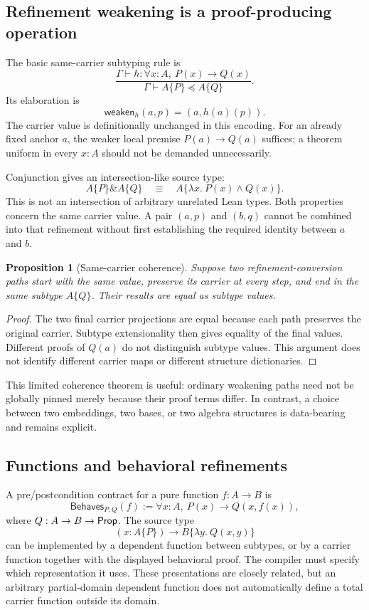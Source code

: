 \documentclass[11pt,letterpaper]{article}
\newtheorem{proposition}[theorem]{Proposition}
\theoremstyle{definition}\newtheorem{definition}[theorem]{Definition}
\begin{document}
\subsection{Refinement weakening is a proof-producing operation}
The basic same-carrier subtyping rule is
\[
 \frac{\Gamma\vdash h:\forall x:A,\ P(x)\to Q(x)}
      {\Gamma\vdash A\{P\}\preceq A\{Q\}}.
\]
Its elaboration is
\[
 \mathsf{weaken}_h(a,p)=(a,h(a)(p)).
\]
The carrier value is definitionally unchanged in this encoding. For an already fixed anchor $a$, the weaker local premise $P(a)\to Q(a)$ suffices; a theorem uniform in every $x:A$ should not be demanded unnecessarily.

Conjunction gives an intersection-like source type:
\[
 A\{P\}\mathbin{\&}A\{Q\}\quad\equiv\quad A\{\lambda x.\ P(x)\land Q(x)\}.
\]
This is not an intersection of arbitrary unrelated Lean types. Both properties concern the same carrier value. A pair $(a,p)$ and $(b,q)$ cannot be combined into that refinement without first establishing the required identity between $a$ and $b$.

\begin{proposition}[Same-carrier coherence]\label{prop:coherence}
Suppose two refinement-conversion paths start with the same value, preserve its carrier at every step, and end in the same subtype $A\{Q\}$. Their results are equal as subtype values.
\end{proposition}
\begin{proof}
The two final carrier projections are equal because each path preserves the original carrier. Subtype extensionality then gives equality of the final values. Different proofs of $Q(a)$ do not distinguish subtype values. This argument does not identify different carrier maps or different structure dictionaries.
\end{proof}
This limited coherence theorem is useful: ordinary weakening paths need not be globally pinned merely because their proof terms differ. In contrast, a choice between two embeddings, two bases, or two algebra structures is data-bearing and remains explicit.

\subsection{Functions and behavioral refinements}
A pre/postcondition contract for a pure function $f:A\to B$ is
\[
 \mathsf{Behaves}_{P,Q}(f)
   :=\forall x:A,\ P(x)\to Q(x,f(x)),
\]
where $Q:A\to B\to\mathsf{Prop}$. The source type
\[
 (x:A\{P\})\longrightarrow B\{\lambda y.\ Q(x,y)\}
\]
can be implemented by a dependent function between subtypes, or by a carrier function together with the displayed behavioral proof. The compiler must specify which representation it uses. These presentations are closely related, but an arbitrary partial-domain dependent function does not automatically define a total carrier function outside its domain.
\end{document}
